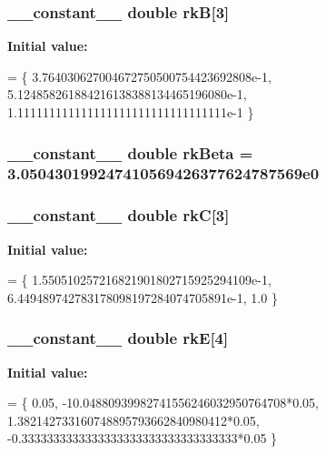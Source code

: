 \subsubsection[{\texorpdfstring{rkB}{rkB}}]{\setlength{\rightskip}{0pt plus 5cm}\+\_\+\+\_\+constant\+\_\+\+\_\+ double rkB\mbox{[}3\mbox{]}}\hypertarget{radau2a_8cu_af1b7e1e9dccdd6c67471dcc6574bbec9}{}\label{radau2a_8cu_af1b7e1e9dccdd6c67471dcc6574bbec9}
{\bfseries Initial value\+:}
\begin{DoxyCode}
= \{
3.764030627004672750500754423692808e-1,
5.124858261884216138388134465196080e-1,
1.111111111111111111111111111111111e-1
\}
\end{DoxyCode}
\subsubsection[{\texorpdfstring{rk\+Beta}{rkBeta}}]{\setlength{\rightskip}{0pt plus 5cm}\+\_\+\+\_\+constant\+\_\+\+\_\+ double rk\+Beta = 3.\+050430199247410569426377624787569e0}\hypertarget{radau2a_8cu_a5b10ed992eb38da8c2514a77f18d6b1f}{}\label{radau2a_8cu_a5b10ed992eb38da8c2514a77f18d6b1f}
\subsubsection[{\texorpdfstring{rkC}{rkC}}]{\setlength{\rightskip}{0pt plus 5cm}\+\_\+\+\_\+constant\+\_\+\+\_\+ double rkC\mbox{[}3\mbox{]}}\hypertarget{radau2a_8cu_aad43fe540a71483ff469d059a7a2ae47}{}\label{radau2a_8cu_aad43fe540a71483ff469d059a7a2ae47}
{\bfseries Initial value\+:}
\begin{DoxyCode}
= \{
1.550510257216821901802715925294109e-1,
6.449489742783178098197284074705891e-1,
1.0
\}
\end{DoxyCode}
\subsubsection[{\texorpdfstring{rkE}{rkE}}]{\setlength{\rightskip}{0pt plus 5cm}\+\_\+\+\_\+constant\+\_\+\+\_\+ double rkE\mbox{[}4\mbox{]}}\hypertarget{radau2a_8cu_a737d65e39448a261886c48517d9bb0b0}{}\label{radau2a_8cu_a737d65e39448a261886c48517d9bb0b0}
{\bfseries Initial value\+:}
\begin{DoxyCode}
= \{
0.05,
-10.04880939982741556246032950764708*0.05,
1.382142733160748895793662840980412*0.05,
-0.3333333333333333333333333333333333*0.05
\}
\end{DoxyCode}
